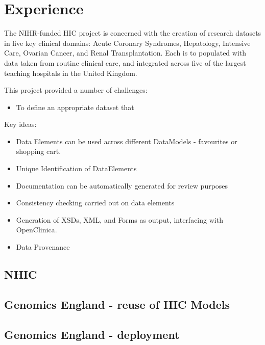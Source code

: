 \section{Experience}



The NIHR-funded HIC project is concerned with the creation of research
datasets in five key clinical domains: Acute Coronary Syndromes,
Hepatology, Intensive Care, Ovarian Cancer, and Renal Transplantation.
Each is to populated with data taken from routine clinical care, and
integrated across five of the largest teaching hospitals in the United
Kingdom.

This project provided a number of challenges:

\begin{itemize}
\item To define an appropriate dataset that 

\end{itemize}

Key ideas:

\begin{itemize}
	\item Data Elements can be used across different DataModels - favourites or shopping cart.
	\item Unique Identification of DataElements 
	\item Documentation can be automatically generated for review purposes
	\item Consistency checking carried out on data elements
	\item Generation of XSDs, XML, and Forms as output, interfacing with OpenClinica.
	\item Data Provenance
\end{itemize}


\subsection{NHIC}

\subsection{Genomics England - reuse of HIC Models}

\subsection{Genomics England -  deployment}
